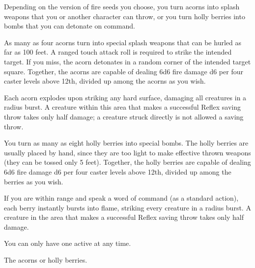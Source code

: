 \spellrng{\rngtouch}
\begin{spelleffect}
  Depending on the version of fire seeds you choose, you turn acorns into splash weapons that you or another character can throw, or you turn holly berries into bombs that you can detonate on command.
  \par {} As many as four acorns turn into special splash weapons that can be hurled as far as 100 feet. A ranged touch attack roll is required to strike the intended target. If you miss, the acorn detonates in a random corner of the intended target square. Together, the acorns are capable of dealing 6d6 fire damage \add d6 per four caster levels above 12th, divided up among the acorns as you wish.
  \par Each acorn explodes upon striking any hard surface, damaging all creatures in a \areasmall radius burst. A creature within this area that makes a successful Reflex saving throw takes only half damage; a creature struck directly is not allowed a saving throw.
  \par {} You turn as many as eight holly berries into special bombs. The holly berries are usually placed by hand, since they are too light to make effective thrown weapons (they can be tossed only 5 feet). Together, the holly berries are capable of dealing 6d6 fire damage \add d6 per four caster levels above 12th, divided up among the berries as you wish.
  \par If you are within \rngmed range and speak a word of command (as a standard action), each berry instantly bursts into flame, striking every creature in a \areamed radius burst. A creature in the area that makes a successful Reflex saving throw takes only half damage.
\end{spelleffect}
\begin{spellnotes}
  You can only have one  active at any time.
\end{spellnotes}
\par {} The acorns or holly berries.

